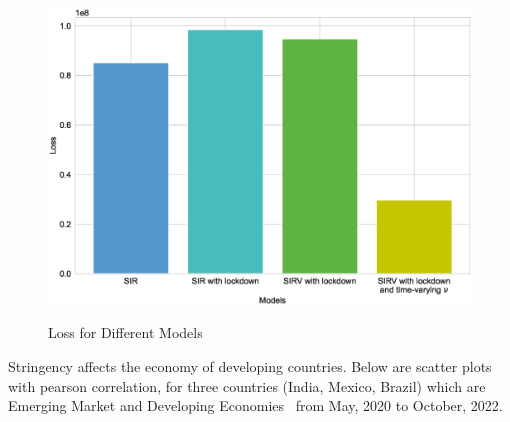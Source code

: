 \documentclass[tikz,fleqn,12pt]{wlscirep}
\begin{document}
\begin{figure}[H]
  \centering
  \caption{Loss for Different Models}
  \includegraphics[width=\linewidth]{images/comparing_costs_IND.eps}
  \label{fig:comparing_costs_IND}
\end{figure}

Stringency affects the economy of developing countries. Below are scatter plots with pearson correlation, for three countries (India, Mexico, Brazil) which are Emerging Market and Developing Economies~\cite{IMFCovid} from May, 2020 to October, 2022.
\end{document}
